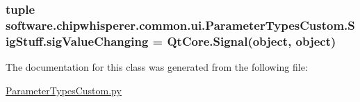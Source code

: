 \subsubsection[{sig\+Value\+Changing}]{\setlength{\rightskip}{0pt plus 5cm}tuple software.\+chipwhisperer.\+common.\+ui.\+Parameter\+Types\+Custom.\+Sig\+Stuff.\+sig\+Value\+Changing = Qt\+Core.\+Signal(object, object)\hspace{0.3cm}{\ttfamily [static]}}\label{classsoftware_1_1chipwhisperer_1_1common_1_1ui_1_1ParameterTypesCustom_1_1SigStuff_a9aca9a683aeb4c93f7780143d00074ac}


The documentation for this class was generated from the following file\+:\begin{DoxyCompactItemize}
\item 
\hyperlink{ParameterTypesCustom_8py}{Parameter\+Types\+Custom.\+py}\end{DoxyCompactItemize}
